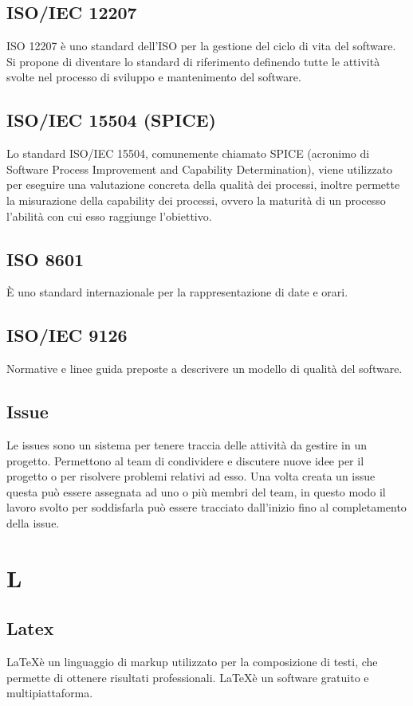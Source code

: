 	\subsection{ISO/IEC 12207}
		ISO 12207 è uno standard dell'ISO per la gestione del ciclo di vita del software. Si propone di diventare lo standard di riferimento definendo tutte le attività svolte nel processo di sviluppo e mantenimento del software.
	\subsection{ISO/IEC 15504 (SPICE)}
	Lo standard ISO/IEC 15504, comunemente chiamato SPICE (acronimo di Software Process Improvement and Capability Determination), viene utilizzato per eseguire una valutazione concreta della qualità dei processi, inoltre permette la misurazione della capability dei processi, ovvero la maturità
	di un processo l’abilità con cui esso raggiunge l’obiettivo.

	\subsection{ISO 8601}
	È uno standard internazionale per la rappresentazione di date e orari.
	\subsection{ISO/IEC 9126}
	Normative e linee guida preposte a descrivere un modello di qualità del software.
	\subsection{Issue}
	Le issues sono un sistema per tenere traccia delle attività da gestire in un progetto. Permettono al team di condividere e discutere nuove idee per il progetto o per risolvere problemi relativi ad esso. Una volta creata un issue questa può essere assegnata ad uno o più membri del team, in questo modo il lavoro svolto per soddisfarla può essere tracciato dall'inizio fino al completamento della issue.
	
	
	\section{L}
	
	\subsection{Latex} 
	\LaTeX è un linguaggio di markup utilizzato per la composizione di testi, che permette di ottenere risultati professionali. \LaTeX è un software gratuito e multipiattaforma.



